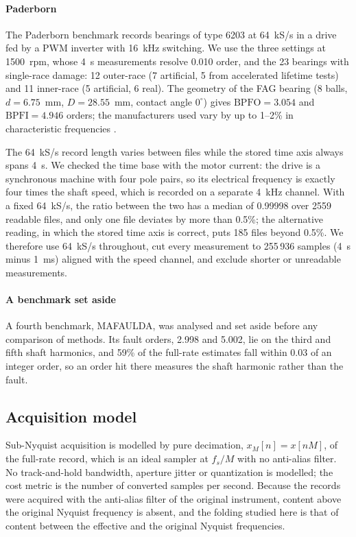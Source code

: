 \paragraph{Paderborn}
The Paderborn benchmark \citep{lessmeier2016paderborn} records bearings of type 6203 at 64~kS/s in a drive
fed by a PWM inverter with 16~kHz switching. We use the three settings at 1500~rpm, whose 4~s
measurements resolve 0.010 order, and the 23 bearings with single-race damage: 12 outer-race (7
artificial, 5 from accelerated lifetime tests) and 11 inner-race (5 artificial, 6 real). The
geometry of the FAG bearing (8 balls, $d = 6.75$~mm, $D = 28.55$~mm, contact angle $0^\circ$) gives
$\mathrm{BPFO} = 3.054$ and $\mathrm{BPFI} = 4.946$ orders; the manufacturers used vary by up to
1--2\% in characteristic frequencies \citep{lessmeier2016paderborn}.

The 64~kS/s record length varies between files while the stored time axis always spans 4~s. We
checked the time base with the motor current: the drive is a synchronous machine with four pole
pairs, so its electrical frequency is exactly four times the shaft speed, which is recorded on a
separate 4~kHz channel. With a fixed 64~kS/s, the ratio between the two has a median of 0.99998
over 2559 readable files, and only one file deviates by more than 0.5\%; the alternative reading,
in which the stored time axis is correct, puts 185 files beyond 0.5\%. We therefore use 64~kS/s
throughout, cut every measurement to 255\,936 samples (4~s minus 1~ms) aligned with the speed
channel, and exclude shorter or unreadable measurements.

\paragraph{A benchmark set aside}
A fourth benchmark, MAFAULDA, was analysed and set aside before any comparison of methods. Its
fault orders, 2.998 and 5.002, lie on the third and fifth shaft harmonics, and 59\% of the
full-rate estimates fall within 0.03 of an integer order, so an order hit there measures the shaft
harmonic rather than the fault.

\subsection{Acquisition model}

Sub-Nyquist acquisition is modelled by pure decimation, $x_M[n] = x[nM]$, of the full-rate record,
which is an ideal sampler at $f_s/M$ with no anti-alias filter. No track-and-hold bandwidth,
aperture jitter or quantization is modelled; the cost metric is the number of converted samples
per second. Because the records were acquired with the anti-alias filter of the original
instrument, content above the original Nyquist frequency is absent, and the folding studied here
is that of content between the effective and the original Nyquist frequencies.

